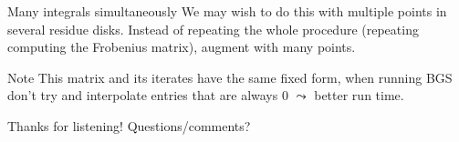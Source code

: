 \begin{frame}{Many integrals simultaneously}
    We may wish to do this with multiple points in several residue disks.
    Instead of repeating the whole procedure (repeating computing the Frobenius matrix), augment with many points.



    \pause%

    \begin{block}{Note}
        This matrix and its iterates have the same fixed form, when running BGS don't try and interpolate entries that are always 0 \(\leadsto\) better run time.
    \end{block}
\end{frame}

\begin{frame}[standout]{Thanks for listening!}
    Questions/comments?

\end{frame}




